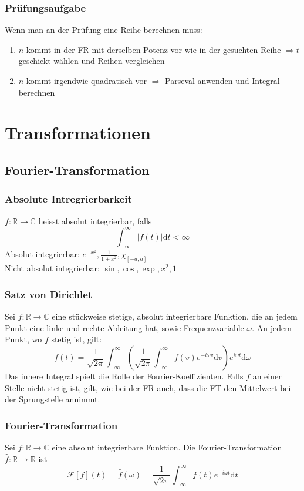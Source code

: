 \documentclass[8pt, a4paper, landscape, fleqn]{scrartcl}
\def\R{\mathbb{R}}
\def\C{\mathbb{C}}
\def\d{\text{d}}
\newcommand{\blue}[1]{\textcolor{ethblue}{#1}}
\def\F{\mathcal{F}}
\begin{document}
\begin{multicols*}{3}
		\subsubsection{Prüfungsaufgabe}
		Wenn man an der Prüfung eine Reihe berechnen muss:
		\begin{enumerate}
		    \item $n$ kommt in der FR mit derselben Potenz vor wie in der gesuchten Reihe $\Rightarrow t$ geschickt wählen und Reihen vergleichen
		    \item $n$ kommt irgendwie quadratisch vor $\Rightarrow$ Parseval anwenden und Integral berechnen
		\end{enumerate}
		
		\section{Transformationen}
		\subsection{Fourier-Transformation}
		\subsubsection{Absolute Intregrierbarkeit}
		$f:\R\to\C$ heisst \blue{absolut integrierbar}, falls $$\int_{-\infty}^\infty |f(t)| \d t < \infty$$
		Absolut integrierbar: $e^{-x^2}, \frac{1}{1+x^2},\chi_{[-a, a]}$ \\
		Nicht absolut integrierbar: $\sin, \cos, \exp, x^2, 1$
		
		\subsubsection{Satz von Dirichlet}
		Sei $f:\R\to\C$ eine stückweise stetige, absolut integrierbare Funktion, die an jedem Punkt eine linke und rechte Ableitung hat, sowie Frequenzvariable $\omega$. An jedem Punkt, wo $f$ stetig ist, gilt: $$f(t) = \frac{1}{\sqrt{2\pi}}\int_{-\infty}^\infty \left(\frac{1}{\sqrt{2\pi}}\int_{-\infty}^\infty f(v)e^{-i\omega v}\d v \right)e^{i\omega t} \d\omega$$
		Das innere Integral spielt die Rolle der Fourier-Koeffizienten. Falls $f$ an einer Stelle nicht stetig ist, gilt, wie bei der FR auch, dass die FT den Mittelwert bei der Sprungstelle annimmt.
		
		\subsubsection{Fourier-Transformation}
		Sei $f:\R\to\C$ eine absolut integrierbare Funktion. Die \blue{Fourier-Transformation} $\hat{f}:\R\to\R$ ist $$\F[f](t)=\hat{f}(\omega) = \frac{1}{\sqrt{2\pi}}\int_{-\infty}^\infty f(t)e^{-i\omega t}\d t$$
		

\end{multicols*}
\end{document}

